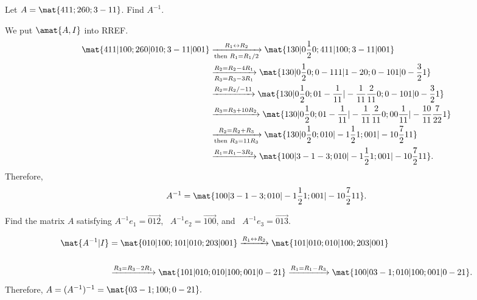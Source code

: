 \begin{problems}
\problem %
Let $A = \mat{4 1 1; 2 6 0; 3 -1 1}$.  Find $A^{-1}$.

\begin{solution}
  We put $\amat{A, I}$ into RREF.
  \begin{align*}
    \mat{4 1 1 | 1 0 0; 2 6 0 | 0 1 0; 3 -1 1 | 0 0 1}
    & \xrightarrow[\textup{then } R_1 = R_1/2]{R_1 \leftrightarrow R_2}
    \mat{1 3 0 | 0 \frac{1}{2} 0; 4 1 1 | 1 0 0; 3 -1 1 | 0 0 1}
    \\ & \xrightarrow[R_3 = R_3-3R_1]{R_2 = R_2 - 4R_1}
         \mat{1 3 0 | 0 \frac{1}{2} 0; 0 -11 1 | 1 -2 0; 0 -10 1
         | 0 -\frac{3}{2} 1}
    \\ & \xrightarrow[]{R_2 = R_2/-11}
    \mat{1 3 0 | 0 \frac{1}{2} 0; 0 1 -\frac{1}{11} |
      -\frac{1}{11} \frac{2}{11} 0; 0 -10 1 | 0 -\frac{3}{2} 1}
    \\ & \xrightarrow[]{R_3 = R_3 + 10R_2}
    \mat{1 3 0 | 0 \frac{1}{2} 0; 0 1 -\frac{1}{11} |
         -\frac{1}{11} \frac{2}{11} 0; 0 0 \frac{1}{11}
         | -\frac{10}{11} \frac{7}{22} 1}
    \\ & \xrightarrow[\textup{then } R_3 = 11R_3]{R_2 = R_2 + R_3}
    \mat{1 3 0 | 0 \frac{1}{2} 0; 0 1 0 |
      -1 \frac{1}{2} 1; 0 0 1 | -10 \frac{7}{2} 11}
    \\ & \xrightarrow[]{R_1 = R_1 - 3R_2}
         \mat{1 0 0 | 3 -1 -3; 0 1 0 | -1 \frac{1}{2} 1; 0 0 1
         | -10 \frac{7}{2} 11}.
   \end{align*}
   Therefore,
   \[ A^{-1} = \mat{1 0 0 | 3 -1 -3; 0 1 0 | -1 \frac{1}{2} 1; 0 0 1 |
       -10 \frac{7}{2} 11}.\]
\end{solution}


\problem %
Find the matrix $A$ satisfying $A^{-1} e_1 = \vec{0 1 2}$, \
$A^{-1} e_2 = \vec{1 0 0}$, and \ $A^{-1}e_3 = \vec{0 1 3}$.

\begin{solution}
  \begin{align*} \mat{A^{-1} | I} & = \mat{0 1 0 | 1 0 0; 1 0 1 | 0 1
      0; 2 0 3 | 0 0 1} \xrightarrow[]{R_1 \leftrightarrow R_2} \mat{1
      0 1 | 0 1 0; 0 1 0 | 1 0 0; 2 0 3 | 0 0 1} \\ \\ &
    \xrightarrow[]{R_3=R_3-2R_1} \mat{1 0 1 | 0 1 0; 0 1 0 | 1 0 0; 0
      0 1 | 0 -2 1} \xrightarrow[]{R_1=R_1-R_3} \mat{1 0 0 | 0 3 -1; 0
      1 0 | 1 0 0; 0 0 1 | 0 -2 1}.
  \end{align*}  
  Therefore, $A=(A^{-1})^{-1} = \mat{0 3 -1; 1 0 0; 0 -2 1}.$
\end{solution}


\end{problems}\setcounter{problem}{0}


\newpage